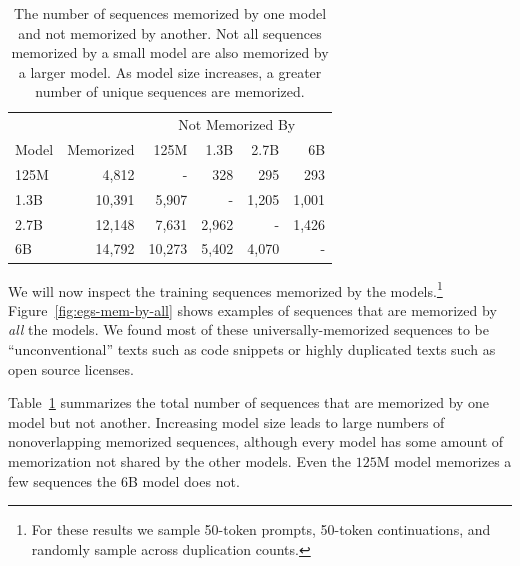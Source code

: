 \begin{table}[t]
    \centering\caption{The number of sequences memorized by one model and not memorized by another. Not all sequences memorized by a small model are also memorized by a larger model. As model size increases, a greater number of unique sequences are memorized.}
    \label{tab:memorized_by_model}
    \small
    \begin{tabular}{@{} l r r r r r @{}}
        \toprule
            &&  \multicolumn{4}{c}{Not Memorized By}\\
        \cmidrule{3-6}
         Model & Memorized & 125M & 1.3B & 2.7B & 6B\\
         \midrule
         125M & 4{,}812 &
         - & \cellcolor{blue!2}328 & \cellcolor{blue!1}295 & \cellcolor{blue!1}293\\
         
         1.3B & 10{,}391 &
         \cellcolor{blue!29}5{,}907 & - & \cellcolor{blue!6}1{,}205 & \cellcolor{blue!5}1{,}001\\
         
         2.7B & 12{,}148 &
         \cellcolor{blue!37}7{,}631 & \cellcolor{blue!14}2{,}962 & - & \cellcolor{blue!7}1{,}426\\
         
         6B & 14{,}792 &
         \cellcolor{blue!50}10{,}273 & \cellcolor{blue!26}5{,}402 & \cellcolor{blue!20}4{,}070 & - \\
         \bottomrule
    \end{tabular}
\end{table}

We will now inspect the training sequences memorized by the models.\footnote{For these results we sample 50-token prompts, 50-token continuations, and randomly sample across duplication counts.} Figure~\ref{fig:egs-mem-by-all}  shows examples of sequences that are memorized by \emph{all} the models. We found most of these universally-memorized sequences to be ``unconventional'' texts such as code snippets or highly duplicated texts such as open source licenses. %

Table~\ref{tab:memorized_by_model} summarizes the total number of sequences that are memorized by
one model but not another.
Increasing model size leads to large numbers of nonoverlapping memorized sequences, although every model has some amount of memorization not shared by the other models.
Even the $125$M model memorizes a few sequences the $6$B model does not.

